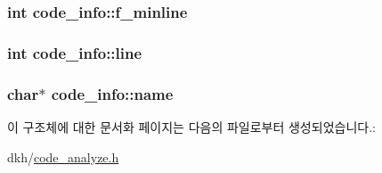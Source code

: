 \hypertarget{structcode__info_ac0a3b579d41a998a2aec410925032aa7}{
\subsubsection[{f\+\_\+minline}]{\setlength{\rightskip}{0pt plus 5cm}int code\+\_\+info\+::f\+\_\+minline}}\label{structcode__info_ac0a3b579d41a998a2aec410925032aa7}
\hypertarget{structcode__info_ad2648840a6e7ba7c9c02ec444a3adac2}{
\subsubsection[{line}]{\setlength{\rightskip}{0pt plus 5cm}int code\+\_\+info\+::line}}\label{structcode__info_ad2648840a6e7ba7c9c02ec444a3adac2}
\hypertarget{structcode__info_ab511aa50afcbcfc1bb2fa4b4a6012e6b}{
\subsubsection[{name}]{\setlength{\rightskip}{0pt plus 5cm}char$\ast$ code\+\_\+info\+::name}}\label{structcode__info_ab511aa50afcbcfc1bb2fa4b4a6012e6b}


이 구조체에 대한 문서화 페이지는 다음의 파일로부터 생성되었습니다.\+:\begin{DoxyCompactItemize}
\item 
dkh/\hyperlink{code__analyze_8h}{code\+\_\+analyze.\+h}\end{DoxyCompactItemize}
